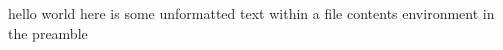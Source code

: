 \documentclass[a4paper]{article}
\begin{document}
	hello world
 here is 
            some
        unformatted text
    within
        a file contents 
           environment
 in the preamble
	
\end{document}
